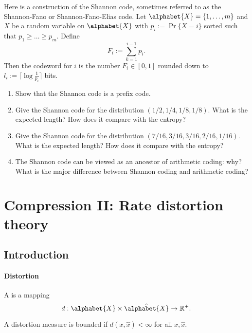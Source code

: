 \documentclass[a4paper, 11pt, openany]{book}
\begin{document}
\begin{exercise} \label{exercise:Shannon_code}
Here is a construction of the Shannon code, sometimes referred to as the Shannon-Fano or Shannon-Fano-Elias code. Let $\alphabet{X} = \{1,\ldots,m\}$ and $X$ be a random variable on $\alphabet{X}$ with $p_i := \Pr\{ X = i\}$ sorted such that $p_1 \ge \dots \ge p_m$. Define
$$
	F_i := \sum_{k=1}^{i-1} p_i.
$$
Then the codeword for $i$ is the number $F_i \in [0,1]$ rounded down to $l_i := \lceil \log \frac{1}{p_i} \rceil$ bits.

\begin{enumerate}
	\item Show that the Shannon code is a prefix code.

	\item Give the Shannon code for the distribution $(1/2, 1/4, 1/8, 1/8)$. What is the expected length? How does it compare with the entropy?

	\item Give the Shannon code for the distribution $(7/16, 3/16, 3/16, 2/16, 1/16)$. What is the expected length? How does it compare with the entropy?

	\item The Shannon code can be viewed as an ancestor of arithmetic coding: why? What is the major difference between Shannon coding and arithmetic coding?
\end{enumerate}
\end{exercise}


\section{Compression II: Rate distortion theory}
\label{sec:36}



\subsection{Introduction}


\paragraph{Distortion}
\begin{definition}
A  is a mapping
$$
	d: \alphabet{X} \times \hat{\alphabet{X}} \to \mathbb{R}^+.
$$
\end{definition}

A distortion measure is bounded if $d(x,\hat{x}) < \infty$ for all $x, \hat{x}$.
\end{document}
